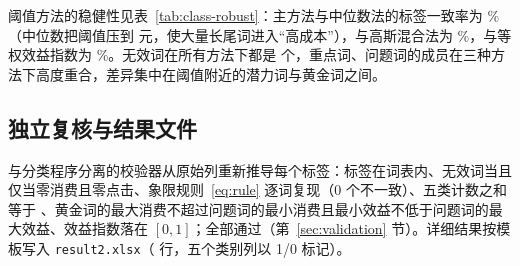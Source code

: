 


阈值方法的稳健性见表~\ref{tab:class-robust}：主方法与中位数法的标签一致率为 \valAgreementJenksMedianPct\%（中位数把阈值压到 \valMedianCostThresholdYuan{} 元，使大量长尾词进入“高成本”），与高斯混合法为 \valAgreementGmmJenksPct\%，与等权效益指数为 \valAgreementJenksEqualWeightsPct\%。无效词在所有方法下都是 \valInvalidCount{} 个，重点词、问题词的成员在三种方法下高度重合，差异集中在阈值附近的潜力词与黄金词之间。


\subsection{独立复核与结果文件}
与分类程序分离的校验器从原始列重新推导每个标签：标签在词表内、无效词当且仅当零消费且零点击、象限规则~\eqref{eq:rule} 逐词复现（0 个不一致）、五类计数之和等于 \valKeywordRows、黄金词的最大消费不超过问题词的最小消费且最小效益不低于问题词的最大效益、效益指数落在 $[0,1]$；全部通过（第~\ref{sec:validation} 节）。详细结果按模板写入 \texttt{result2.xlsx}（\valKeywordRows{} 行，五个类别列以 1/0 标记）。
